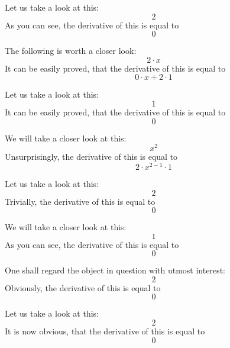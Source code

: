 \documentclass{article}
\begin{document}
Let us take a look at this:
\begin{equation}
2 
\end{equation}
As you can see, the derivative of this is equal to
\begin{equation}
0 
\end{equation}

The following is worth a closer look:
\begin{equation}
2 \cdot x 
\end{equation}
It can be easily proved, that the derivative of this is equal to
\begin{equation}
0 \cdot x + 2 \cdot 1 
\end{equation}

Let us take a look at this:
\begin{equation}
1 
\end{equation}
It can be easily proved, that the derivative of this is equal to
\begin{equation}
0 
\end{equation}

We will take a closer look at this:
\begin{equation}
x ^{2 } 
\end{equation}
Unsurprisingly, the derivative of this is equal to
\begin{equation}
2 \cdot x ^{2 - 1 } \cdot 1 
\end{equation}

Let us take a look at this:
\begin{equation}
2 
\end{equation}
Trivially, the derivative of this is equal to
\begin{equation}
0 
\end{equation}

We will take a closer look at this:
\begin{equation}
1 
\end{equation}
As you can see, the derivative of this is equal to
\begin{equation}
0 
\end{equation}

One shall regard the object in question with utmost interest:
\begin{equation}
2 
\end{equation}
Obviously, the derivative of this is equal to
\begin{equation}
0 
\end{equation}

Let us take a look at this:
\begin{equation}
2 
\end{equation}
It is now obvious, that the derivative of this is equal to
\begin{equation}
0 
\end{equation}
\end{document}
